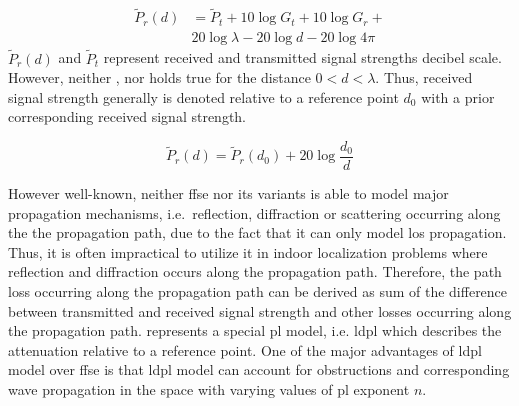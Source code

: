    \begin{equation}
      \begin{split}
        \label{eq:friisdBm}
        \widetilde{P}_r(d) &= \widetilde{P}_t + 10 \log{G_t} + 10 \log{G_r} + \\
        & 20 \log{\lambda} - 20 \log{d} - 20 \log{4 \pi}
      \end{split}
    \end{equation}
    $\widetilde{P}_r(d)$ and $\widetilde{P}_t$ represent received and transmitted signal strengths decibel scale.
    However, neither , nor  holds true for the distance $0<d<\lambda$.
    Thus, received signal strength generally is denoted relative to a reference point $d_0$ with a prior corresponding received signal strength.

    \begin{equation}
        \label{eq:friisRef}
        \widetilde{P}_r(d) = \widetilde{P}_r(d_0) + 20 \log{\dfrac{d_0}{d}}
    \end{equation}


    However well-known, neither \gls{ffse} nor its variants  is able to model major propagation mechanisms, i.e.\ reflection, diffraction or scattering occurring along the the propagation path, due to the fact that it can only model \gls{los} propagation.
    Thus, it is often impractical to utilize it in indoor localization problems where reflection and diffraction occurs along the propagation path.
    Therefore, the path loss occurring along the propagation path can be derived as sum of the difference between transmitted and received signal strength and other losses occurring along the propagation path.
     represents a special \gls{pl} model, i.e. \gls{ldpl} which describes the attenuation relative to a reference point.
    One of the major advantages of \gls{ldpl} model over \gls{ffse} is that \gls{ldpl} model can account for obstructions and corresponding wave propagation in the space with varying values of \gls{pl} exponent $n$.


